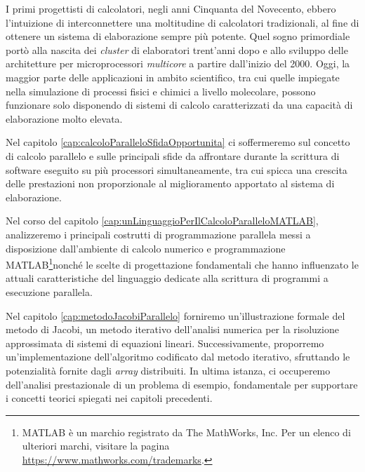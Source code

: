 I primi progettisti di calcolatori, negli anni Cinquanta del Novecento, ebbero l'intuizione di interconnettere
una moltitudine di calcolatori tradizionali, al fine di ottenere un sistema di elaborazione sempre più potente.
Quel sogno primordiale port\`o alla nascita dei \textit{cluster} di elaboratori trent'anni dopo e allo sviluppo delle architetture per microprocessori
\textit{multicore} a partire dall'inizio del 2000.\newline
Oggi, la maggior parte delle applicazioni in ambito scientifico, tra cui quelle impiegate nella simulazione di processi fisici e chimici a livello molecolare, possono funzionare solo disponendo di sistemi di calcolo caratterizzati da una capacit\`a di elaborazione molto elevata.

Nel capitolo \ref{cap:calcoloParalleloSfidaOpportunita} ci soffermeremo sul concetto di calcolo parallelo e sulle principali sfide da affrontare
durante la scrittura di software eseguito su pi\`u processori simultaneamente, tra cui spicca una crescita delle prestazioni non proporzionale
al miglioramento apportato al sistema di elaborazione.

Nel corso del capitolo \ref{cap:unLinguaggioPerIlCalcoloParalleloMATLAB}, analizzeremo i principali costrutti di programmazione parallela messi a disposizione dall’ambiente di calcolo numerico
e programmazione MATLAB\textsuperscript{\textregistered}\footnote{MATLAB \`e un marchio registrato da The MathWorks, Inc. Per un elenco di ulteriori marchi, visitare la pagina \url{https://www.mathworks.com/trademarks}.}nonch\'e le scelte di progettazione fondamentali che hanno influenzato
le attuali caratteristiche del linguaggio dedicate alla scrittura di programmi a esecuzione parallela.

Nel capitolo \ref{cap:metodoJacobiParallelo} forniremo un'illustrazione formale del metodo di Jacobi, un metodo iterativo dell’analisi numerica per la risoluzione
approssimata di sistemi di equazioni lineari. Successivamente, proporremo un’implementazione dell'algoritmo codificato dal metodo iterativo, sfruttando le potenzialità fornite
dagli \textit{array} distribuiti. In ultima istanza, ci occuperemo dell’analisi prestazionale di un problema di esempio, fondamentale per supportare i concetti teorici spiegati nei capitoli precedenti.
